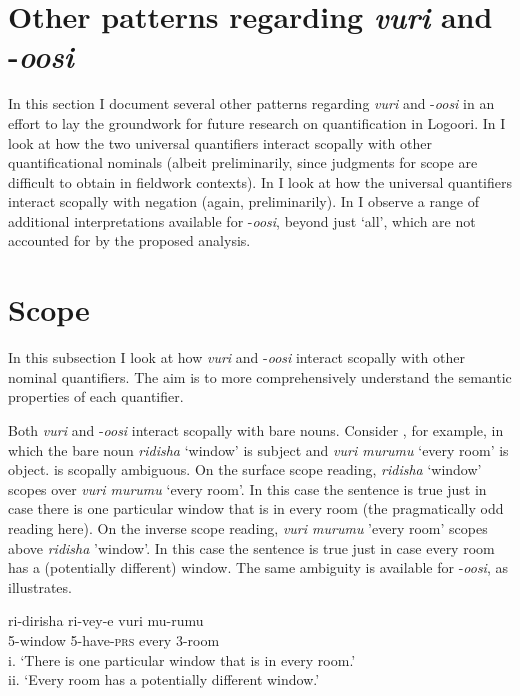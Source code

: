 \documentclass[output=paper]{langsci/langscibook}
\begin{document}
\section{Other patterns regarding \textit{vuri} and -\textit{oosi}}

In this section I document several other patterns regarding \textit{vuri} and -\textit{oosi} in an effort to lay the groundwork for future research on quantification in Logoori. In  I look at how the two universal quantifiers interact scopally with other quantificational nominals (albeit preliminarily, since judgments for scope are difficult to obtain in fieldwork contexts). In  I look at how the universal quantifiers interact scopally with negation (again, preliminarily). In  I observe a range of additional interpretations available for -\textit{oosi}, beyond just ‘all’, which are not accounted for by the proposed analysis.

\section{Scope} 

In this subsection I look at how \textit{vuri} and -\textit{oosi} interact scopally with other nominal quantifiers. The aim is to more comprehensively understand the semantic properties of each quantifier.

Both \textit{vuri} and -\textit{oosi} interact scopally with bare nouns. Consider , for example, in which the bare noun \textit{ridisha} ‘window’ is subject and \textit{vuri murumu} ‘every room’ is object.  is scopally ambiguous. On the surface scope reading, \textit{ridisha} ‘window’ scopes over \textit{vuri murumu} ‘every room’. In this case the sentence is true just in case there is one particular window that is in every room (the pragmatically odd reading here). On the inverse scope reading, \textit{vuri murumu} 'every room' scopes above \textit{ridisha} 'window'. In this case the sentence is true just in case every room has a (potentially different) window. The same ambiguity is available for -\textit{oosi}, as  illustrates.

\ea 
\gll ri-dirisha  ri-vey-e  vuri  mu-rumu  \\
     5-window  5-have-\textsc{prs}  every  3-room\\
\glt i. ‘There is one particular window that is in every room.’  \\
ii. ‘Every room has a potentially different window.’  
\z
\end{document}
